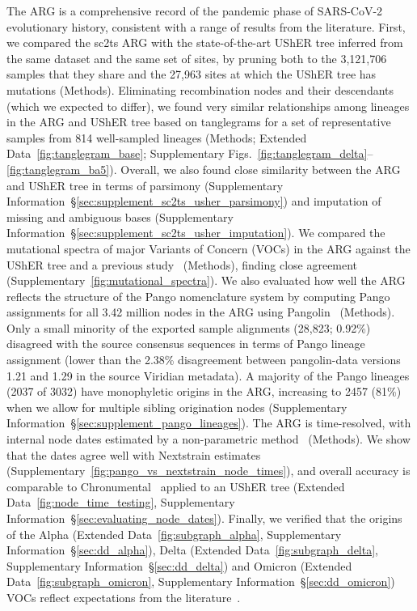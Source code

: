 \documentclass[12pt]{article}
\makeatletter
\newcommand{\supref}[1]{Supplementary Information~\S\ref{#1}}
\newcommand{\edref}[1]{Extended Data~\ref{#1}}
\newcommand{\siref}[1]{Supplementary~\ref{#1}}
\newcommand{\refprefix}[1]{#1~}
\newcommand{\numref}[1]{{\let\refprefix\@gobble\ref{#1}}}
\makeatother
\begin{document}
The ARG is a comprehensive record of
the pandemic phase of SARS-CoV-2 evolutionary history,
consistent with a range of results from the literature.
First, we compared the sc2ts ARG
with the state-of-the-art UShER tree inferred from the same dataset
and the same set of sites,
by pruning both to the 3,121,706 samples that they share
and the 27,963 sites at which the UShER tree has mutations (Methods).
Eliminating recombination nodes and their descendants (which we expected to differ),
we found very similar relationships among lineages in
the ARG and UShER tree based on tanglegrams
for a set of representative samples from 814 well-sampled lineages
(Methods; \edref{fig:tanglegram_base};
Supplementary Figs.~\numref{fig:tanglegram_delta}--\numref{fig:tanglegram_ba5}).
Overall, we also found close similarity between the ARG
and UShER tree in terms of parsimony
(\supref{sec:supplement_sc2ts_usher_parsimony})
and imputation of missing and ambiguous bases
(\supref{sec:supplement_sc2ts_usher_imputation}).
We compared the mutational spectra of major Variants of Concern (VOCs) in the ARG
against the UShER tree and a previous study~\cite{Bloom2023} (Methods),
finding close agreement (\siref{fig:mutational_spectra}).
We also evaluated how well the ARG reflects the structure of
the Pango nomenclature system
by computing Pango assignments for all 3.42 million nodes in the ARG
using Pangolin~\cite{OToole2021assignment} (Methods).
Only a small minority of the exported sample alignments (28,823; 0.92\%) disagreed
with the source consensus sequences in terms of Pango lineage assignment
(lower than the 2.38\% disagreement between pangolin-data
versions 1.21 and 1.29 in the source Viridian metadata).
A majority of the Pango lineages (2037 of 3032)
have monophyletic origins in the ARG,
increasing to 2457 (81\%) when we allow
for multiple sibling origination nodes
(\supref{sec:supplement_pango_lineages}).
The ARG is time-resolved, with internal node dates estimated
by a non-parametric method~\cite{Pope2025} (Methods).
We show that the dates agree well with
Nextstrain estimates (\siref{fig:pango_vs_nextstrain_node_times}),
and overall accuracy is comparable to
Chronumental~\cite{sanderson2021chronumental} applied to
an UShER tree (\edref{fig:node_time_testing},
\supref{sec:evaluating_node_dates}).
Finally, we verified
that the origins of the
Alpha (\edref{fig:subgraph_alpha}, \supref{sec:dd_alpha}),
Delta (\edref{fig:subgraph_delta}, \supref{sec:dd_delta})
and
Omicron (\edref{fig:subgraph_omicron}, \supref{sec:dd_omicron})
VOCs reflect expectations from the literature~\cite{RambautAlpha2020,ECDCreport,
Cherian2021,Farinholt2021,Stern2021,Dor2025,RambautOmicron2021}.
\end{document}
